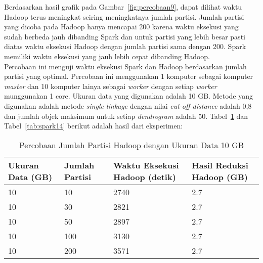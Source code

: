 Berdasarkan hasil grafik pada Gambar~\ref{fig:percobaan9}, dapat dilihat waktu Hadoop terus meningkat seiring meningkatnya jumlah partisi. Jumlah partisi yang dicoba pada Hadoop hanya mencapai 200 karena waktu eksekusi yang sudah berbeda jauh dibanding Spark dan untuk partisi yang lebih besar pasti diatas waktu eksekusi Hadoop dengan jumlah partisi sama dengan 200. Spark memiliki waktu eksekusi yang jauh lebih cepat dibanding Hadoop.\\  



Percobaan ini menguji waktu eksekusi Spark dan Hadoop berdasarkan jumlah partisi yang optimal. Percobaan ini menggunakan 1 komputer sebagai komputer \textit{master} dan 10 komputer lainya sebagai \textit{worker} dengan setiap \textit{worker} munggunakan 1 core. Ukuran data yang digunakan adalah 10 GB. Metode yang digunakan adalah metode \textit{single linkage} dengan nilai \textit{cut-off distance} adalah 0,8 dan jumlah objek maksimum untuk setiap \textit{dendrogram} adalah 50. Tabel~\ref{tab:spark13} dan Tabel~\ref{tab:spark14} berikut adalah hasil dari eksperimen:





\begin{table}[H] 
	\centering 
	\caption{Percobaan Jumlah Partisi Hadoop dengan Ukuran Data 10 GB}
	\label{tab:spark13}
	\begin{tabular}{|p{3cm}|p{3cm}|p{4cm}|p{4cm}|}
\hline
Ukuran Data (GB) & Jumlah Partisi &  Waktu Eksekusi Hadoop (detik) & Hasil Reduksi Hadoop (GB)\\
\hline
10 & 10 & 2740  & 2.7  \\
\hline
10 & 30 & 2821  & 2.7  \\
\hline
10 & 50 & 2897 & 2.7   \\
\hline
10 & 100 & 3130 & 2.7   \\
\hline
10 & 200 & 3571 & 2.7   \\
\hline


\hline

	\end{tabular} 
\end{table}




